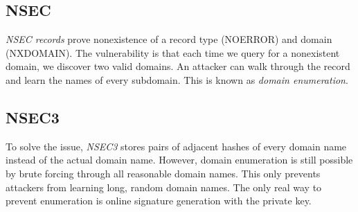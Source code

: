 \subsection{NSEC}
\emph{NSEC records} prove nonexistence of a record type (NOERROR) and domain (NXDOMAIN). The vulnerability is that each time we query for a nonexistent domain, we discover two valid domains. An attacker can walk through the record and learn the names of every subdomain. This is known as \emph{domain enumeration}.

\subsection{NSEC3}
To solve the issue, \emph{NSEC3} stores pairs of adjacent hashes of every domain name instead of the actual domain name. However, domain enumeration is still possible by brute forcing through all reasonable domain names. This only prevents attackers from learning long, random domain names. The only real way to prevent enumeration is online signature generation with the private key.